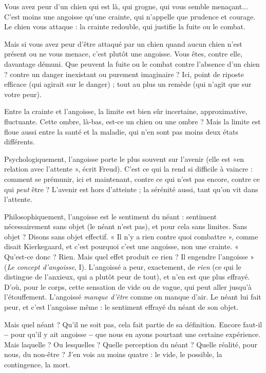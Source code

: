 Vous avez peur d’un chien qui est là, qui grogne, qui vous semble menaçant...
C’est moins une angoisse qu’une crainte, qui n’appelle que prudence et
courage. Le chien vous attaque : la crainte redouble, qui justifie la fuite ou le
combat.

Mais si vous avez peur d’être attaqué par un chien quand aucun chien n’est
présent ou ne vous menace, c’est plutôt une angoisse. Vous êtes, contre elle,
davantage démuni. Que peuvent la fuite ou le combat contre l'absence d’un
chien ? contre un danger inexistant ou purement imaginaire ? Ici, point de
riposte efficace (qui agirait sur le danger) ; tout au plus un remède (qui n’agit
que sur votre peur).

Entre la crainte et l'angoisse, la limite est bien sûr incertaine, approximative,
fluctuante. Cette ombre, là-bas, est-ce un chien ou une ombre ? Mais la
limite est floue aussi entre la santé et la maladie, qui n’en sont pas moins deux
états différents.

Psychologiquement, l'angoisse porte le plus souvent sur l'avenir (elle est
«en relation avec l'attente », écrit Freud). C’est ce qui la rend si difficile à
vaincre : comment se prémunir, ici et maintenant, contre ce qui n'est pas
encore, contre ce qui {\it peut} être ? L'avenir est hors d’atteinte ; la sérénité aussi,
tant qu’on vit dans l'attente.

Philosophiquement, l’angoisse est le sentiment du néant : sentiment nécessairement
sans objet (le néant n’est pas), et pour cela sans limites. Sans objet ?
Disons sans objet effectif. « Il n’y a rien contre quoi combattre », comme disait
Kierkegaard, et c’est pourquoi c’est une angoisse, non une crainte. « Qu'est-ce
donc ? Rien. Mais quel effet produit ce rien ? Il engendre l'angoisse » ({\it Le
concept d'angoisse}, I). L’angoissé a peur, exactement, de {\it rien} (ce qui le distingue
de l’anxieux, qui a plutôt peur de tout), et n’en est que plus effrayé. D'où, pour
le corps, cette sensation de vide ou de vague, qui peut aller jusqu’à l’étouffement.
L’angoissé {\it manque d'être} comme on manque d’air. Le néant lui fait peur,
et c’est l’angoisse même : le sentiment effrayé du néant de son objet.

Mais quel néant ? Qu'il ne soit pas, cela fait partie de sa définition. Encore
faut-il {\bf --} pour qu’il y ait angoisse {\bf --} que nous en ayons pourtant une certaine
expérience. Mais laquelle ? Ou lesquelles ? Quelle perception du néant ? Quelle
réalité, pour nous, du non-être ? J'en vois au moins quatre : le vide, le possible,
la contingence, la mort.

